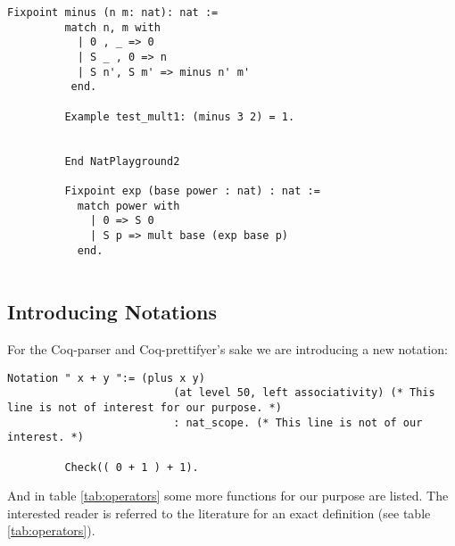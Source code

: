 	   \begin{lstlisting}[label = lst:minus_nat, caption={ \lstinline!minus! and \lstinline!exp!}]
	    Fixpoint minus (n m: nat): nat :=
	     match n, m with
	       | 0 , _ => 0
	       | S _ , 0 => n
	       | S n', S m' => minus n' m'
	      end.
	      
	     Example test_mult1: (minus 3 2) = 1.
	     
	      
	     End NatPlayground2
	     
	     Fixpoint exp (base power : nat) : nat :=
	       match power with
	         | 0 => S 0
	         | S p => mult base (exp base p)
	       end.
	         
	   \end{lstlisting}
	   
   \subsection{Introducing Notations}
	
	    For the Coq-parser and Coq-prettifyer's sake we are introducing a new notation:
	    
	    \begin{lstlisting}[caption= operator overloading of \lstinline!+!] 
	     Notation " x + y ":= (plus x y)
	                      (at level 50, left associativity) (* This line is not of interest for our purpose. *)
	                      : nat_scope. (* This line is not of our interest. *)
	                      
	     Check(( 0 + 1 ) + 1).
	    \end{lstlisting}    
	   And in table \ref{tab:operators} some more functions for our purpose are listed.
	   The interested reader is referred to the literature for an exact definition (see table \ref{tab:operators}).  
	   

